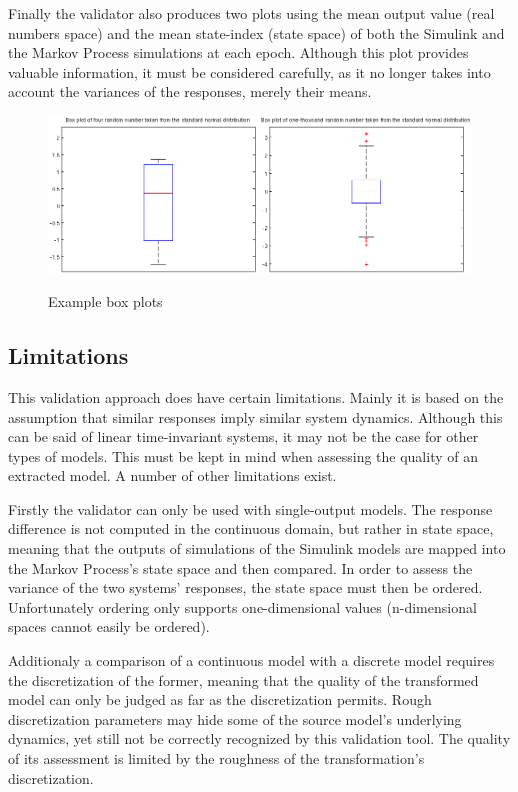 Finally the validator also produces two plots using the mean output value (real numbers space) and the mean state-index (state space) of both the Simulink and the Markov Process simulations at each epoch. Although this plot provides valuable information, it must be considered carefully, as it no longer takes into account the variances of the responses, merely their means.

\begin{figure}
\begin{center}
\includegraphics[width=16cm]{media/boxplotexample}\\
\end{center}
\caption{Example box plots}
\label{boxplotexample}
\end{figure}


\subsection{Limitations}

This validation approach does have certain limitations. Mainly it is based on the assumption that similar responses imply similar system dynamics. Although this can be said of linear time-invariant systems, it may not be the case for other types of models. This must be kept in mind when assessing the quality of an extracted model. A number of other limitations exist.

Firstly the validator can only be used with single-output models. The response difference is not computed in the continuous domain, but rather in state space, meaning that the outputs of simulations of the Simulink models are mapped into the Markov Process's state space and then compared. In order to assess the variance of the two systems' responses, the state space must then be ordered. Unfortunately ordering only supports one-dimensional values (n-dimensional spaces cannot easily be ordered).

Additionaly a comparison of a continuous model with a discrete model requires the discretization of the former, meaning that the quality of the transformed model can only be judged as far as the discretization permits. Rough discretization parameters may hide some of the source model's underlying dynamics, yet still not be correctly recognized by this validation tool. The quality of its assessment is limited by the roughness of the transformation's discretization.


